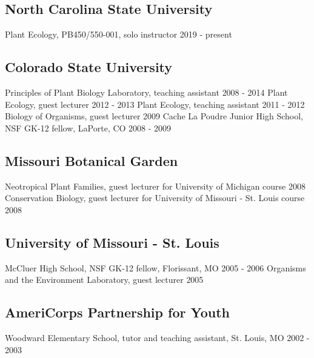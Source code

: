 \documentclass[11pt,english]{article}
\begin{document}
\subsection*{North Carolina State University}
Plant Ecology, PB450/550-001, solo instructor \hfill {2019 - present} 

\subsection*{Colorado State University}
Principles of Plant Biology Laboratory, teaching assistant \hfill {2008 - 2014} \newline
Plant Ecology, guest lecturer \hfill {2012 - 2013} \newline
Plant Ecology, teaching assistant \hfill {2011 - 2012} \newline
Biology of Organisms, guest lecturer \hfill {2009} \newline
Cache La Poudre Junior High School, NSF GK-12 fellow, LaPorte, CO \hfill {2008 - 2009}

\subsection*{Missouri Botanical Garden}
Neotropical Plant Families, guest lecturer for University of Michigan course \hfill {2008} \newline
Conservation Biology, guest lecturer for University of Missouri - St. Louis course \hfill {2008} 

\subsection*{University of Missouri - St. Louis}
McCluer High School, NSF GK-12 fellow, Florissant, MO \hfill {2005 - 2006} \newline
Organisms and the Environment Laboratory, guest lecturer \hfill {2005} 

\subsection*{AmeriCorps Partnership for Youth}
Woodward Elementary School, tutor and teaching assistant, St. Louis, MO \hfill {2002 - 2003} 
\end{document}
